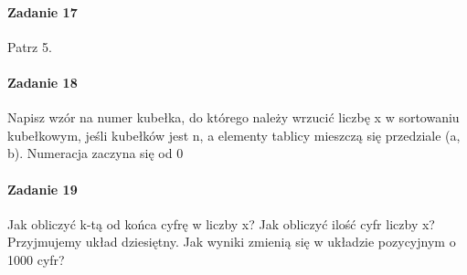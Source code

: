 \documentclass[18pt]{extarticle}
\begin{document}
\paragraph{Zadanie 17} Patrz 5.

\paragraph{Zadanie 18} Napisz wzór na numer kubełka, do którego należy wrzucić liczbę x w sortowaniu kubełkowym, jeśli kubełków jest n, a elementy tablicy mieszczą się przedziale (a, b). Numeracja zaczyna się od 0

\paragraph{Zadanie 19} Jak obliczyć k-tą od końca cyfrę w liczby x? Jak obliczyć ilość cyfr liczby x? Przyjmujemy układ dziesiętny. Jak wyniki zmienią się w układzie pozycyjnym o 1000 cyfr?
\end{document}

